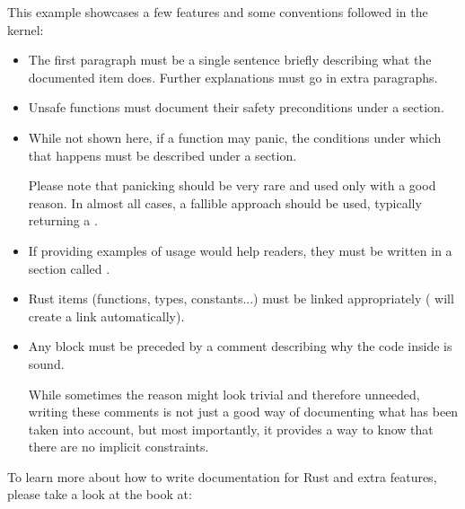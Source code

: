 \documentclass[a4paper,11pt,english]{sphinxmanual}
\begin{document}
This example showcases a few  features and some conventions followed
in the kernel:
\begin{itemize}
\item {} 
The first paragraph must be a single sentence briefly describing what
the documented item does. Further explanations must go in extra paragraphs.

\item {} 
Unsafe functions must document their safety preconditions under
a  section.

\item {} 
While not shown here, if a function may panic, the conditions under which
that happens must be described under a  section.

Please note that panicking should be very rare and used only with a good
reason. In almost all cases, a fallible approach should be used, typically
returning a .

\item {} 
If providing examples of usage would help readers, they must be written in
a section called .

\item {} 
Rust items (functions, types, constants...) must be linked appropriately
( will create a link automatically).

\item {} 
Any  block must be preceded by a  comment
describing why the code inside is sound.

While sometimes the reason might look trivial and therefore unneeded,
writing these comments is not just a good way of documenting what has been
taken into account, but most importantly, it provides a way to know that
there are no  implicit constraints.

\end{itemize}

To learn more about how to write documentation for Rust and extra features,
please take a look at the  book at:
\begin{quote}

\end{quote}
\end{document}
